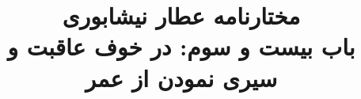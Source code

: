 \documentclass[14pt,b5paper]{article}
\begin{document}
\title{\Huge مختارنامه عطار نیشابوری \\
باب بیست و سوم: در خوف عاقبت و سیری نمودن از عمر}
\author{ }
\date{ }
\maketitle
\newpage
\tableofcontents
\newpage

\newpage

\newpage

\newpage

\newpage

\newpage

\newpage

\newpage

\newpage

\newpage

\newpage

\newpage

\newpage

\newpage

\newpage

\newpage

\newpage

\newpage

\newpage

\newpage

\newpage

\newpage

\newpage

\newpage

\newpage

\newpage

\newpage

\newpage

\newpage

\newpage

\newpage

\newpage

\newpage

\newpage

\newpage

\newpage

\newpage

\newpage

\newpage

\newpage

\newpage

\newpage

\newpage

\newpage

\newpage

\newpage

\newpage

\newpage

\newpage

\newpage

\newpage

\newpage

\newpage

\newpage

\newpage

\newpage

\newpage

\newpage

\newpage

\newpage

\newpage

\newpage

\newpage

\newpage

\newpage

\newpage

\newpage

\newpage

\newpage

\newpage

\newpage

\newpage

\newpage

\newpage

\newpage

\newpage

\newpage

\newpage
\end{document}
